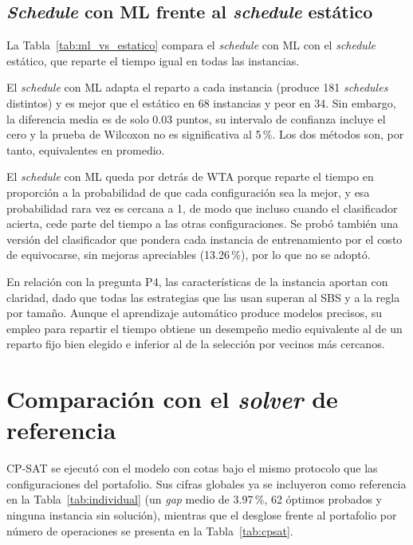 \subsection{\textit{Schedule} con ML frente al \textit{schedule} estático}

La Tabla~\ref{tab:ml_vs_estatico} compara el \textit{schedule} con ML con el
\textit{schedule} estático, que reparte el tiempo igual en todas las
instancias.



El \textit{schedule} con ML adapta el reparto a cada instancia (produce 181
\textit{schedules} distintos) y es mejor que el estático en 68 instancias y
peor en 34. Sin embargo, la diferencia media es de solo 0.03 puntos, su
intervalo de confianza incluye el cero y la prueba de Wilcoxon no es
significativa al 5\,\%. Los dos métodos son, por tanto, equivalentes en
promedio.

El \textit{schedule} con ML queda por detrás de WTA porque reparte el tiempo en
proporción a la probabilidad de que cada configuración sea la mejor, y esa
probabilidad rara vez es cercana a 1, de modo que incluso cuando el
clasificador acierta, cede parte del tiempo a las otras configuraciones. Se
probó también una versión del clasificador que pondera cada instancia de
entrenamiento por el costo de equivocarse, sin mejoras apreciables (13.26\,\%),
por lo que no se adoptó.

En relación con la pregunta P4, las características de la instancia aportan con
claridad, dado que todas las estrategias que las usan superan al SBS y a la
regla por tamaño. Aunque el aprendizaje automático produce modelos precisos, su
empleo para repartir el tiempo obtiene un desempeño medio equivalente al de un
reparto fijo bien elegido e inferior al de la selección por vecinos más
cercanos.

\section{Comparación con el \textit{solver} de referencia}
\label{sec:res_referencia}

CP-SAT se ejecutó con el modelo con cotas bajo el mismo protocolo que las
configuraciones del portafolio. Sus cifras globales ya se incluyeron como
referencia en la Tabla~\ref{tab:individual} (un \textit{gap} medio de
3.97\,\%, 62 óptimos probados y ninguna instancia sin solución), mientras que
el desglose frente al portafolio por número de operaciones se presenta en la
Tabla~\ref{tab:cpsat}.

